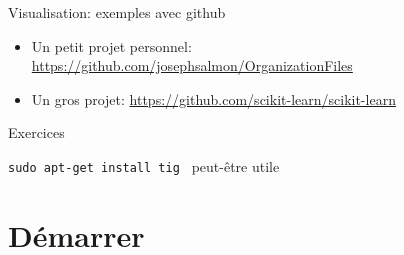 \documentclass[unknownkeysallowed]{beamer}
\begin{document}
\begin{frame}{Visualisation: exemples avec github}

\begin{itemize}
  \item Un petit projet personnel: \url{https://github.com/josephsalmon/OrganizationFiles}

  \vspace{1.3cm}

  \item Un gros projet: \url{https://github.com/scikit-learn/scikit-learn}


\end{itemize}


\end{frame}


\begin{frame}{Exercices}


\vspace{1.5cm}

\vspace{0.5cm}

\rem \texttt{sudo apt-get install tig } peut-être utile
\end{frame}


\section{Démarrer}
\label{sec:démarrer}
\end{document}
